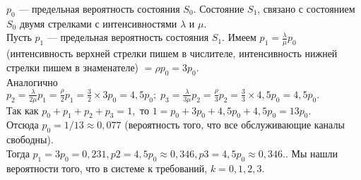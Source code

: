 \documentclass{article}
\begin{document}
\indent $p_0$ — предельная вероятность состояния $S_0$. Состояние $S_1$, связано с состоянием $S_0$ двумя стрелками с интенсивностями $\lambda$ и $\mu$. \\ 
\indent Пусть $p_1$ — предельная вероятность состояния $S_1$. Имеем $p_1 = \frac{\lambda}{\mu}p_0$  (интенсивность верхней стрелки пишем в числителе, интенсивность нижней  стрелки  пишем  в  знаменателе) $= \rho p_0 = 3p_0.$ \\ Аналогично $p_2 = \frac{\lambda}{2\mu}p_1 = \frac{\rho}{2}p_1 = \frac{3}{2}\times 3p_0 = 4,5p_0; \; p_3 = \frac{\lambda}{3\mu}p_2=\frac{\rho}{3}p_2 = \frac{3}{3}\times 4,5p_0 = 4,5p_0.$
\\ \indent Так как $p_0 + p_1 + p_2 + p_3 = 1,$ то $1 = p_0 + 3p_0 + 4,5p_0 + 4,5p_0 = 13p_0.$ \\
Отсюда $p_0 = 1 /13 \approx 0,077$ (вероятность того, что все обслуживающие каналы свободны). \\ Тогда $p_1 = 3p_0 = 0,231, p2 = 4,5p_0 \approx 0,346, p3 = 4,5p_0 \approx 0,346.$.  Мы  нашли  вероятности  того,  что  в  системе $к$ требований, $k = 0, 1, 2, 3.$  \\ \indent
\end{document}
